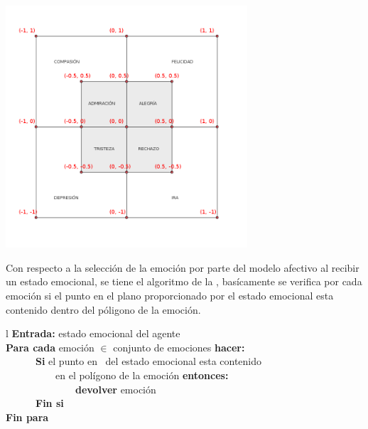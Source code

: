 \begin{ilustracion}[fuente=\yo, etiqueta=modelo-afectivo-puntos, titulo={Representación Gráfica de los Puntos que Conforman los Polígonos de las Emociones}]
\includegraphics[width=9cm]{ilustraciones/propuesta/modelo-afectivo.png}
\end{ilustracion}

Con respecto a la selección de la emoción por parte del modelo afectivo al recibir un estado emocional,
se tiene el algoritmo de la , basícamente se
verifica por cada emoción si el punto en el plano proporcionado por el estado emocional
esta contenido dentro del póligono de la emoción.

\begin{cuadro}[etiqueta=algoritmo-modelo-afectivo, titulo={Algoritmo del Modelo Afectivo Para la Selección de Una Emoción}]{l}
\toprule
\textbf{Entrada:} estado emocional del agente \\
\midrule
\textbf{Para cada} emoción \textbf{$\in$} conjunto de emociones \textbf{hacer:} \\
~~~~~~\textbf{Si} el punto en \Rcuadrado~del estado emocional esta contenido \\
~~~~~~~~~~en el polígono de la emoción \textbf{entonces:} \\
~~~~~~~~~~~~~~\textbf{devolver} emoción \\
~~~~~~\textbf{Fin si} \\
\textbf{Fin para} \\
\bottomrule
{}
\end{cuadro}


